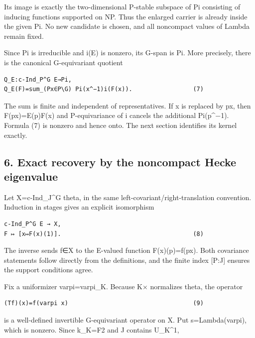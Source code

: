 Its image is exactly the two-dimensional P-stable subspace of Pi
consisting of inducing functions supported on NP. Thus the enlarged
carrier is already inside the given Pi. No new candidate is chosen, and
all noncompact values of Lambda remain fixed.

Since Pi is irreducible and i(E) is nonzero, its G-span is Pi. More
precisely, there is the canonical G-equivariant quotient

\begin{Verbatim}[fontsize=\small,breaklines=true,breakanywhere=true]
Q_E:c-Ind_P^G E→Pi,
Q_E(F)=sum_(Px∈P\G) Pi(x^−1)i(F(x)).                 (7)
\end{Verbatim}

The sum is finite and independent of representatives. If x is replaced
by px, then F(px)=E(p)F(x) and P-equivariance of i cancels the
additional Pi(p\^{}−1). Formula (7) is nonzero and hence onto. The next
section identifies its kernel exactly.

\hypertarget{rank2-exact-recovery-by-the-noncompact-hecke-eigenvalue}{%
\subsection{6. Exact recovery by the noncompact Hecke
eigenvalue}\label{rank2-exact-recovery-by-the-noncompact-hecke-eigenvalue}}

Let X=c-Ind\_J\^{}G theta, in the same left-covariant/right-translation
convention. Induction in stages gives an explicit isomorphism

\begin{Verbatim}[fontsize=\small,breaklines=true,breakanywhere=true]
c-Ind_P^G E → X,
F ↦ [x↦F(x)(1)].                                     (8)
\end{Verbatim}

The inverse sends f∈X to the E-valued function F(x)(p)=f(px). Both
covariance statements follow directly from the definitions, and the
finite index {[}P:J{]} ensures the support conditions agree.

Fix a uniformizer varpi=varpi\_K. Because K× normalizes theta, the
operator

\begin{Verbatim}[fontsize=\small,breaklines=true,breakanywhere=true]
(Tf)(x)=f(varpi x)                                   (9)
\end{Verbatim}

is a well-defined invertible G-equivariant operator on X. Put
s=Lambda(varpi), which is nonzero. Since k\_K=F2 and J contains
U\_K\^{}1,

